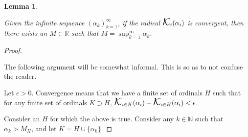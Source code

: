 \documentclass[
]{article}
\DeclareMathOperator*{\kap}{\text{\Large{$\mathcal K$}}}
\theoremstyle{theorem}
\theoremstyle{lemma}
\newtheorem{lemma}{Lemma}
\theoremstyle{corollary}
\theoremstyle{remark}
\theoremstyle{definition}
\begin{document}
\begin{lemma}
\hypertarget{lemma-11}{%
\label{lemma-11}}


Given the infinite sequence \((\alpha_k)_{k=1}^\infty\), if the radical \(\kap_i(\alpha_i)\) is convergent, then there exists an \(M \in \mathbb R\) such that \(M = \sup_{k=1}^\infty \alpha_k\).

\end{lemma}
\begin{proof}

\hypertarget{proof-14}{%
\label{proof-14}}
The following argument will be somewhat informal. This is so as to not confuse the reader.

Let \(\epsilon > 0\). Convergence means that we have a finite set of ordinals \(H\) such that for any finite set of ordinals \(K \supset H\), \(\kap_{i\in K}(\alpha_i) - \kap_{i \in H}(\alpha_i) < \epsilon\).

Consider an \(H\) for which the above is true. Consider any \(k \in \mathbb N\) such that \(\alpha_k > M_H\), and let \(K = H \cup \{\alpha_k\}\).


\end{proof}
\end{document}
